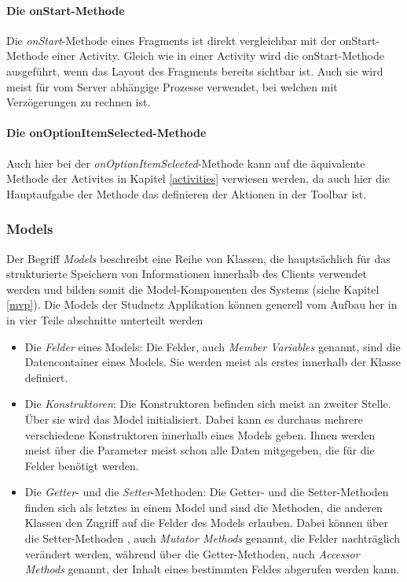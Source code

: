 \documentclass[../main.tex]{subfiles}
\begin{document}
	\paragraph{Die onStart-Methode}
	Die \emph{onStart}-Methode eines Fragments ist direkt vergleichbar mit der onStart-Methode einer Activity. Gleich wie in einer Activity wird die onStart-Methode ausgeführt, wenn das Layout des Fragments bereits sichtbar ist. Auch sie wird meist für vom Server abhängige Prozesse verwendet, bei welchen mit Verzögerungen zu rechnen ist.
	
	\paragraph{Die onOptionItemSelected-Methode}
	Auch hier bei der \emph{onOptionItemSelected}-Methode kann auf die äquivalente Methode der Activites in Kapitel \ref{activities} verwiesen werden, da auch hier die Hauptaufgabe der Methode das definieren der Aktionen in der Toolbar ist.
	
	\subsubsection{Models}
	Der Begriff \emph{Models} beschreibt eine Reihe von Klassen, die hauptsächlich für das strukturierte Speichern von Informationen innerhalb des Clients verwendet werden und bilden somit die Model-Komponenten des Systems (siehe Kapitel \ref{mvp}). Die Models der Studnetz Applikation können generell vom Aufbau her in in vier Teile abschnitte unterteilt werden
	
	\begin{itemize}
		\item Die \emph{Felder} eines Models: Die Felder, auch \emph{Member Variables} genannt, sind die Datencontainer eines Models. Sie werden meist als erstes innerhalb der Klasse definiert. \cite{memberVariables}
		\item Die \emph{Konstruktoren}: Die Konstruktoren befinden sich meist an zweiter Stelle. Über sie wird das Model initialisiert. Dabei kann es durchaus mehrere verschiedene Konstruktoren innerhalb eines Models geben. Ihnen werden meist über die Parameter meist schon alle Daten mitgegeben, die für die Felder benötigt werden.
		\item  Die \emph{Getter}- und die \emph{Setter}-Methoden: Die Getter- und die Setter-Methoden finden sich als letztes in einem Model und sind die Methoden, die anderen Klassen den Zugriff auf die Felder des Models erlauben. Dabei können über die Setter-Methoden , auch \emph{Mutator Methods} genannt, die Felder nachträglich verändert werden, während über die Getter-Methoden, auch \emph{Accessor Methods} genannt, der Inhalt eines bestimmten Feldes abgerufen werden kann. \cite{accessorsAndMutators}
	\end{itemize}
	
\end{document}
